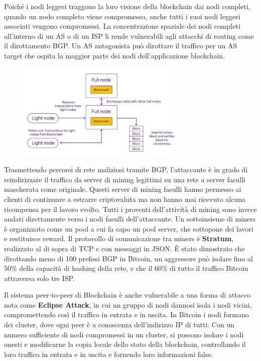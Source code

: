 Poiché i nodi leggeri traggono la loro visione della blockchain dai nodi completi, quando un nodo completo viene compromesso, anche tutti i suoi nodi leggeri associati vengono compromessi. La concentrazione spaziale dei nodi completi all'interno di un AS o di un ISP li rende vulnerabili agli attacchi di routing come il dirottamento BGP. Un AS antagonista può dirottare il traffico per un AS target che ospita la maggior parte dei nodi dell'applicazione blockchain.

\begin{figure}[htb!]
    \centering
    \includegraphics[width=8cm]{./Images/cap5/5.5.png}
\end{figure}

Trasmettendo percorsi di rete maliziosi tramite BGP, l'attaccante è in grado di reindirizzare il traffico da server di mining legittimi su una rete a server fasulli mascherata come originale. Questi server di mining fasulli hanno permesso ai clienti di continuare a estrarre criptovaluta ma non hanno mai ricevuto alcuna ricompensa per il lavoro svolto. Tutti i proventi dell'attività di mining sono invece andati direttamente verso i nodi fasulli dell'attaccante. Un sottoinsieme di miners è organizzato come un pool a cui fa capo un pool server, che sottopone dei lavori e restituisce reward. Il protocollo di comunicazione tra miners è \textbf{Stratum}, realizzato al di sopra di TCP e con messaggi in JSON. È stato dimostrato che dirottando meno di 100 prefissi BGP in Bitcoin, un aggressore può isolare fino al 50\% della capacità di hashing della rete, e che il 60\% di tutto il traffico Bitcoin attraversa solo tre ISP.

\vspace{5mm}

Il sistema peer-to-peer di Blockchain è anche vulnerabile a una forma di attacco nota come \textbf{Eclipse Attack}, in cui un gruppo di nodi dannosi isola i nodi vicini, compromettendo così il traffico in entrata e in uscita. In Bitcoin i nodi formano dei cluster, dove ogni peer è a conoscenza dell'indirizzo IP di tutti. Con un numero sufficiente di nodi compromessi in un cluster, si possono isolare i nodi onesti e modificarne la copia locale dello stato della blockchain, controllando il loro traffico in entrata e in uscita e fornendo loro informazioni false.

